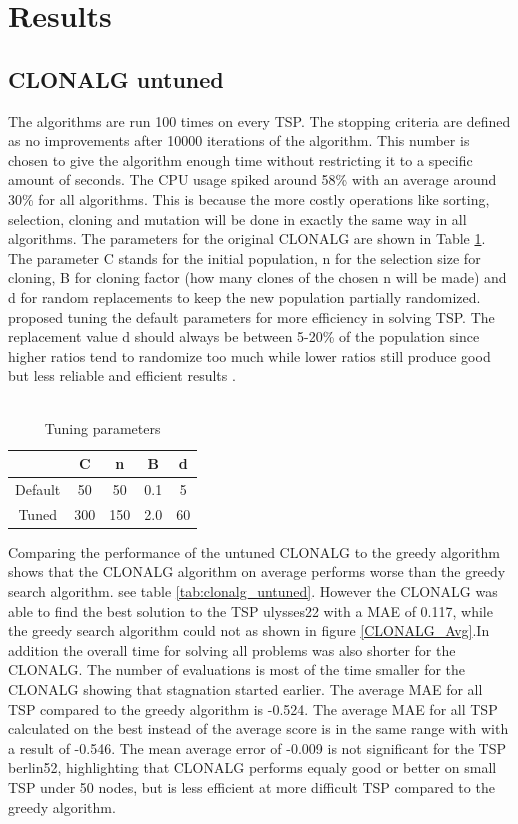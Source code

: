 \section{Results}
\subsection{CLONALG untuned}
The algorithms are run 100 times on every TSP. The stopping criteria are defined as no improvements after 10000 iterations of the algorithm. This number is chosen to give the algorithm enough time without restricting it to a specific amount of seconds. The CPU usage spiked around 58\% with an average around 30\% for all algorithms. This is because the more costly operations like sorting, selection, cloning and mutation will be done in exactly the same way in all algorithms.
The parameters for the original CLONALG are shown in Table \ref{tuning}.\\
The parameter C stands for the initial population, n for the selection size for cloning, B for cloning factor (how many clones of the chosen n will be made) and d for random replacements to keep the new population partially randomized. \cite{DEC02} proposed tuning the default parameters for more efficiency in solving TSP. The replacement value d should always be between 5-20\% of the population since higher ratios tend to randomize too much while lower ratios still produce good but less reliable and efficient results \cite{DEC02}.\\\\
\begin{table}[H]
	\begin{tabular}{|c|c|c|c|c|}
		\hline
		& C   & n   & B   & d  \\ \hline
		Default & 50  & 50  & 0.1 & 5  \\ \hline
		Tuned   & 300 & 150 & 2.0 & 60 \\ \hline
	\end{tabular}
	\caption{Tuning parameters}
	\label{tuning}
\end{table} 
Comparing the performance of the untuned CLONALG to the greedy algorithm shows that the CLONALG algorithm on average performs worse than the greedy search algorithm. see table \ref{tab:clonalg_untuned}. However the CLONALG was able to find the best solution to the TSP ulysses22 with a MAE of 0.117, while the greedy search algorithm could not as shown in figure \ref{CLONALG_Avg}.In addition the overall time for solving all problems was also shorter for the CLONALG. The number of evaluations is most of the time smaller for the CLONALG showing that stagnation started earlier. The average MAE for all TSP compared to the greedy algorithm is -0.524. The average MAE for all TSP calculated on the best instead of the average score is in the same range with with a result of -0.546. The mean average error of -0.009 is not significant for the TSP berlin52, highlighting that CLONALG performs equaly good or better on small TSP under 50 nodes, but is less efficient at more difficult TSP compared to the greedy algorithm.
